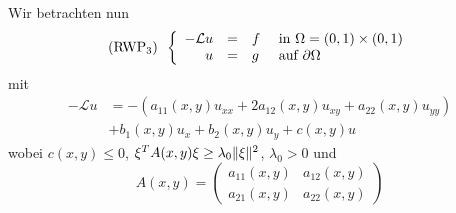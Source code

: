 \documentclass{cheat-sheet}
\newcommand{\bOmega}{\partial \Omega} %
\newcommand{\LL}{\mathcal{L}} %
\newcommand{\tss}[1]{\textsubscript{#1}} %
\begin{document}
\begin{prob}
  Wir betrachten nun
  \[ \text{(RWP\tss{3})} \enspace \left\{ \begin{array}{rlll}
    - \LL u &=& f &\text{ in $\Omega = \ointerval{0}{1} \times \ointerval{0}{1}$} \\
    u &=& g &\text{ auf $\bOmega$}
  \end{array} \right. \]
  mit
  \begin{align*}
    - \LL u&  = - (a_{11}(x, y) u_{xx} + 2 a_{12}(x, y) u_{xy} + a_{22}(x, y) u_{yy}) \\
    & + b_1(x, y) u_x + b_2(x, y) u_y + c(x, y) u
  \end{align*}
  wobei $c(x, y) \leq 0$, $\xi^T A(x, y) \xi \geq \lambda_0 \lVert\xi\rVert^2$, $\lambda_0 > 0$ und
  \[
    A(x, y) = \begin{pmatrix}
      a_{11}(x,y) & a_{12}(x,y) \\
      a_{21}(x,y) & a_{22}(x,y)
    \end{pmatrix}
  \]
\end{prob}
\end{document}
